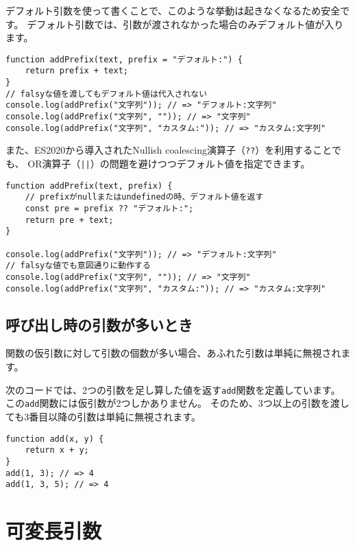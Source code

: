 デフォルト引数を使って書くことで、このような挙動は起きなくなるため安全です。
デフォルト引数では、引数が渡されなかった場合のみデフォルト値が入ります。

\begin{lstlisting}
function addPrefix(text, prefix = "デフォルト:") {
    return prefix + text;
}
// falsyな値を渡してもデフォルト値は代入されない
console.log(addPrefix("文字列")); // => "デフォルト:文字列"
console.log(addPrefix("文字列", "")); // => "文字列"
console.log(addPrefix("文字列", "カスタム:")); // => "カスタム:文字列"
\end{lstlisting}

また、ES2020から導入されたNullish coalescing演算子（\texttt{??}）を利用することでも、
OR演算子（\lstinline{||}）の問題を避けつつデフォルト値を指定できます。

\begin{lstlisting}
function addPrefix(text, prefix) {
    // prefixがnullまたはundefinedの時、デフォルト値を返す
    const pre = prefix ?? "デフォルト:";
    return pre + text;
}

console.log(addPrefix("文字列")); // => "デフォルト:文字列"
// falsyな値でも意図通りに動作する
console.log(addPrefix("文字列", "")); // => "文字列"
console.log(addPrefix("文字列", "カスタム:")); // => "カスタム:文字列"
\end{lstlisting}

\hypertarget{function-more-arguments}{%
\subsection{呼び出し時の引数が多いとき}\label{function-more-arguments}}

関数の仮引数に対して引数の個数が多い場合、あふれた引数は単純に無視されます。

次のコードでは、2つの引数を足し算した値を返す\texttt{add}関数を定義しています。
この\texttt{add}関数には仮引数が2つしかありません。
そのため、3つ以上の引数を渡しても3番目以降の引数は単純に無視されます。

\begin{lstlisting}
function add(x, y) {
    return x + y;
}
add(1, 3); // => 4
add(1, 3, 5); // => 4
\end{lstlisting}

\hypertarget{variable-arguments}{%
\section{可変長引数}\label{variable-arguments}}

